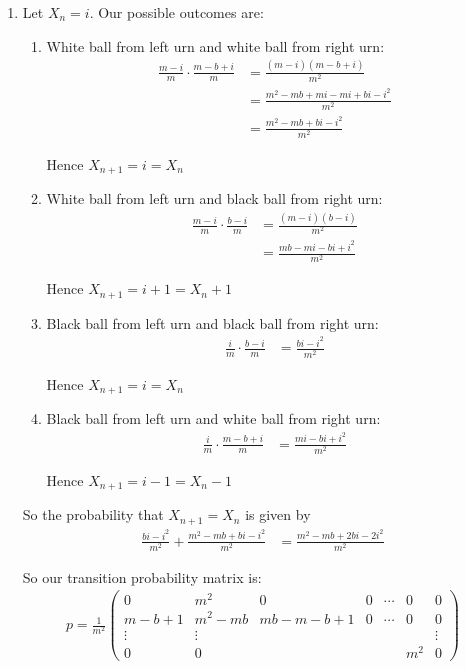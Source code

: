 \documentclass[12pt]{article}
\begin{document}
\begin{enumerate}[label=(\alph*)]
\item Let $X_n = i$. Our possible outcomes are:
\begin{enumerate}
\item White ball from left urn and white ball from right urn:
\begin{align*}
\frac{m-i}{m} \cdot \frac{m-b+i}{m} &= \frac{(m-i)(m-b+i)}{m^2}\\
&= \frac{m^2 - mb + mi - mi + bi - i^2}{m^2}\\
&= \frac{m^2 - mb + bi - i^2}{m^2}
\end{align*}

Hence $X_{n+1} = i = X_n$

\item White ball from left urn and black ball from right urn:
\begin{align*}
\frac{m-i}{m} \cdot \frac{b-i}{m} &= \frac{(m-i)(b-i)}{m^2}\\
&= \frac{mb - mi - bi + i^2}{m^2}
\end{align*}

Hence $X_{n+1} = i + 1 = X_n + 1$


\item Black ball from left urn and black ball from right urn:
\begin{align*}
\frac{i}{m} \cdot \frac{b-i}{m} &= \frac{bi - i^2}{m^2}
\end{align*}

Hence $X_{n+1} = i = X_n$

\item Black ball from left urn and white ball from right urn:
\begin{align*}
\frac{i}{m} \cdot \frac{m-b+i}{m} &= \frac{mi - bi + i^2}{m^2}
\end{align*}

Hence $X_{n+1} = i - 1 = X_n - 1$
\end{enumerate}

So the probability that $X_{n+1} = X_n$ is given by
\begin{align*}
\frac{bi - i^2}{m^2} + \frac{m^2 - mb + bi - i^2}{m^2} &= \frac{m^2 - mb + 2bi - 2i^2}{m^2}
\end{align*}

So our transition probability matrix is:
\begin{align*}
p = \frac{1}{m^2} \begin{pmatrix}
0 & m^2 & 0 & 0 & \cdots & 0 & 0\\
m - b + 1 & m^2 - mb & mb - m - b + 1 & 0 & \cdots & 0 & 0\\
\vdots & \vdots & & & & & \vdots\\
0 & 0 & & & & m^2 & 0
\end{pmatrix}
\end{align*}


\end{enumerate}
\end{document}
